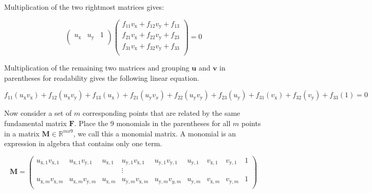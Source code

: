 Multiplication of the two rightmost matrices gives:

\begin{equation}
\begin{pmatrix}
u_\mathrm{x} & u_\mathrm{y} & 1 \\
\end{pmatrix}
\begin{pmatrix}
f_{11} v_\mathrm{x} + f_{12} v_\mathrm{y} + f_{13} \\
f_{21} v_\mathrm{x} + f_{22} v_\mathrm{y} + f_{23} \\
f_{31} v_\mathrm{x} + f_{32} v_\mathrm{y} + f_{33} \\
\end{pmatrix}
= 0
\end{equation}

Multiplication of the remaining two matrices and grouping $\textbf{u}$ and $\textbf{v}$ in parentheses for readability gives the following linear equation.

\begin{equation}
f_{11} (u_\mathrm{x} v_\mathrm{x}) + f_{12} (u_\mathrm{x} v_\mathrm{y}) + f_{13} (u_\mathrm{x}) +
f_{21} (u_\mathrm{y} v_x) + f_{22} (u_\mathrm{y} v_\mathrm{y}) + f_{23} (u_\mathrm{y}) +
f_{31} (v_\mathrm{x}) + f_{32} (v_\mathrm{y}) + f_{33} (1)
= 0
\end{equation}

Now consider a set of $m$ corresponding points that are related by the same fundamental matrix $\textbf{F}$. Place the 9 monomials in the parentheses for all $m$ points in a matrix $\textbf{M} \in \mathbb{R}^{mx9} $, we call this a monomial matrix. A monomial is an expression in algebra that contains only one term.

\begin{equation}
\mathbf{M}=
\begin{pmatrix}
u_{\mathrm{x},1} v_{\mathrm{x},1} & u_{\mathrm{x},1} v_{\mathrm{y},1} & u_{\mathrm{x},1} & u_{\mathrm{y},1} v_{\mathrm{x},1} & u_{\mathrm{y},1} v_{\mathrm{y},1} & u_{\mathrm{y},1} & v_{\mathrm{x},1} & v_{\mathrm{y},1} & 1 \\
 & & & \vdots & & & & & \\
u_{\mathrm{x},m} v_{\mathrm{x},m} & u_{\mathrm{x},m} v_{\mathrm{y},m} & u_{\mathrm{x},m} & u_{\mathrm{y},m} v_{\mathrm{x},m} & u_{\mathrm{y},m} v_{y,m} & u_{\mathrm{y},m} & v_{\mathrm{x},m} & v_{\mathrm{y},m} & 1 \\
\end{pmatrix}
\end{equation}

